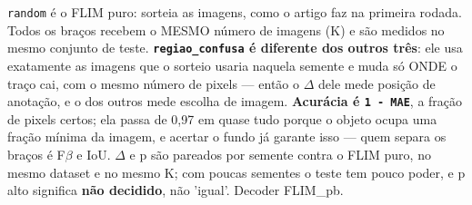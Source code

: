 \footnotesize \texttt{random} é o FLIM puro: sorteia as imagens, como o artigo faz na primeira rodada. Todos os braços recebem o MESMO número de imagens (K) e são medidos no mesmo conjunto de teste. \textbf{\texttt{regiao\_confusa} é diferente dos outros três}: ele usa exatamente as imagens que o sorteio usaria naquela semente e muda só ONDE o traço cai, com o mesmo número de pixels --- então o $\Delta$ dele mede posição de anotação, e o dos outros mede escolha de imagem. \textbf{Acurácia é \texttt{1 - MAE}}, a fração de pixels certos; ela passa de 0,97 em quase tudo porque o objeto ocupa uma fração mínima da imagem, e acertar o fundo já garante isso --- quem separa os braços é F$\beta$ e IoU. $\Delta$ e p são pareados por semente contra o FLIM puro, no mesmo dataset e no mesmo K; com poucas sementes o teste tem pouco poder, e p alto significa \textbf{não decidido}, não 'igual'. Decoder FLIM\_pb.
\normalsize
